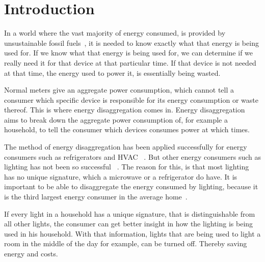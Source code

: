 
\chapter{Introduction}
\label{chp:introduction}

\vspace{1\baselineskip}

\noindent


In a world where the vast majority of energy consumed, is provided by unsustainable fossil fuels~\cite{kolter2011redd}, it is needed to know exactly what that energy is being used for. 
If we know what that energy is being used for, we can determine if we really need it for that device at that particular time.
If that device is not needed at that time, the energy used to power it, is essentially being wasted.




Normal meters give an aggregate power consumption, which cannot tell a consumer which specific device is responsible for its energy consumption or waste thereof.
This is where energy disaggregation comes in.
Energy disaggregation aims to break down the aggregate power consumption of, for example a household, to tell the consumer which devices consumes power at which times.




The method of energy disaggregation has been applied successfully for energy consumers such as refrigerators and HVAC~\cite{kolter2011redd} \cite{spiegel2014energy}.
But other energy consumers such as lighting has not been so successful~\cite{spiegel2014energy} \cite{batra2015neighbourhood}.
The reason for this, is that most lighting has no unique signature, which a microwave or a refrigerator do have.
It is important to be able to disaggregate the energy consumed by lighting, because it is the third largest energy consumer in the average home~\cite{batra2015neighbourhood}.




If every light in a household has a unique signature, that is distinguishable from all other lights, the consumer can get better insight in how the lighting is being used in his household. 
With that information, lights that are being used to light a room in the middle of the day for example, can be turned off.
Thereby saving energy and costs.

















